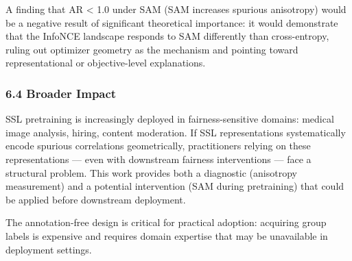 A finding that AR < 1.0 under SAM (SAM increases spurious anisotropy) would be a negative result of significant theoretical importance: it would demonstrate that the InfoNCE landscape responds to SAM differently than cross-entropy, ruling out optimizer geometry as the mechanism and pointing toward representational or objective-level explanations.

\subsubsection{6.4 Broader Impact}

SSL pretraining is increasingly deployed in fairness-sensitive domains: medical image analysis, hiring, content moderation. If SSL representations systematically encode spurious correlations geometrically, practitioners relying on these representations --- even with downstream fairness interventions --- face a structural problem. This work provides both a diagnostic (anisotropy measurement) and a potential intervention (SAM during pretraining) that could be applied before downstream deployment.

The annotation-free design is critical for practical adoption: acquiring group labels is expensive and requires domain expertise that may be unavailable in deployment settings.

